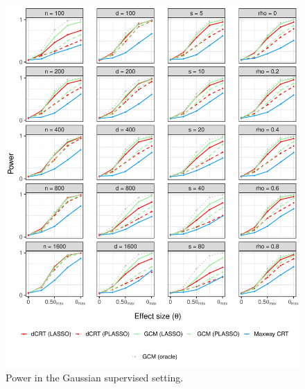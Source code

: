 \documentclass[aos]{imsart}
\theoremstyle{plain}
\theoremstyle{remark}
\begin{document}
\begin{figure}[!ht]
	\centering
	\includegraphics[width = \textwidth]{figures/gaussian_supervised_setting_alternative.pdf}
	\caption{Power in the Gaussian supervised setting.}
	\label{fig:gaussian_supervised_alternative}
\end{figure}
\end{document}
